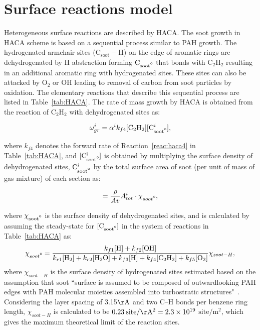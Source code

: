 \section{Surface reactions model}
\label{sec:surfreacmodel}
Heterogeneous surface reactions are described by HACA. The soot growth in HACA scheme is based on a sequential process similar to PAH growth. The hydrogenated armchair sites ($\mathrm{C_{soot}-H}$) on the edge of aromatic rings are dehydrogenated by H abstraction forming $\mathrm{C_{soot\mbox{\textdegree}}}$ that bonds with $\mathrm{C_2H_2}$ resulting in an additional aromatic ring with hydrogenated sites. These sites can also be attacked by $\mathrm{O_2}$ or $\mathrm{OH}$ leading to removal of carbon from soot particles by oxidation. The elementary reactions that describe this sequential process are listed in Table~\ref{tab:HACA}.
The rate of mass growth by HACA is obtained from the reaction of $\mathrm{C_2H_2}$ with dehydrogenated sites as:

\begin{equation}
	\omega^i_{gr} = \alpha^i k_{f4} [\mathrm{C_2H_2}][\mathrm{C}^i_\mathrm{soot\mbox{\textdegree}}]
	\label{eqn:hacaRate},
\end{equation}

\noindent  where ${k_{f4}}$ denotes the forward rate of Reaction~\eqref{reac:haca4} in Table~\ref{tab:HACA}, and $\mathrm{[C^i_{soot\mbox{\textdegree}}]}$ is obtained by multiplying the surface density of dehydrogenated sites, $\mathrm{C}^i_\mathrm{soot\mbox{\textdegree}}$ by the total surface area of soot (per unit of mass of gas mixture) of each section as:

\begin{equation}
	[\mathrm{C}^i_\mathrm{soot\mbox{\textdegree}}] = \frac{\rho}{Av}A^i_{tot}\cdot\chi_{soot\mbox{\textdegree}}
	\label{eqn:csoot0},
\end{equation}

\noindent where $\mathrm{\chi_{soot\mbox{\textdegree}}}$ is the surface density of dehydrogenated sites, and is calculated by assuming the steady-state for $\mathrm{[C_{soot\mbox{\textdegree}}]}$ in the system of reactions in Table~\ref{tab:HACA} as:
\begin{equation}
	\chi_{soot{\mbox{\textdegree}}} = 
	\frac
	{k_{f1}[\mathrm{H}]+k_{f2}[\mathrm{OH}]}
	{k_{r1}[\mathrm{H_2}]+k_{r2}[\mathrm{H_2O}]+k_{f3}[\mathrm{H}]+k_{f4}[\mathrm{C_2H_2}]+k_{f5}[\mathrm{O_2}]} \chi_{soot-{H}},
	\label{eqn:chisoot0}
\end{equation}
\noindent where ${\chi_{soot-{H}}}$ is the surface density of hydrogenated sites estimated based on the assumption that soot ``surface is assumed to be composed of outwardlooking PAH edges with PAH molecular moieties assembled into turbostratic structures"~\citep{frenklach2019new}. Considering the layer spacing of 3.15$\mathrm{\AA}$ and two C–H bonds per benzene ring length, $\chi_{{soot}-H}$ is calculated to be $0.23\:\mathrm{site/\AA^2}=2.3\times10^{19}$ $ \mathrm{site/m^2}$, which gives the maximum theoretical limit of the reaction sites.

